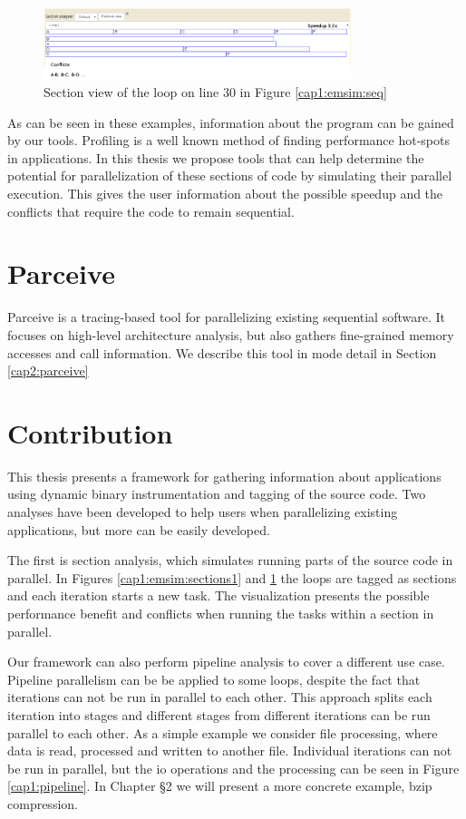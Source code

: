 \begin{figure}[!ht]
	\centering
	\includegraphics[width=0.8\textwidth]{loop2section}
	\caption{Section view of the loop on line 30 in Figure \ref{cap1:emsim:seq}}
	\label{cap1:emsim:sections2}
\end{figure}

As can be seen in these examples, information about the program can be gained by our tools. Profiling is a well known method of finding performance hot-spots in applications. In this thesis we propose tools that can help determine the potential for parallelization of these sections of code by simulating their parallel execution. This gives the user information about the possible speedup and the conflicts that require the code to remain sequential.

\section{Parceive}

Parceive \cite{parceive} is a tracing-based tool for parallelizing existing sequential software. It focuses on high-level architecture analysis, but also gathers fine-grained memory accesses and call information. We describe this tool in mode detail in Section \ref{cap2:parceive}

\section {Contribution}

This thesis presents a framework for gathering information about applications using dynamic binary instrumentation and tagging of the source code. Two analyses have been developed to help users when parallelizing existing applications, but more can be easily developed.

The first is section analysis, which simulates running parts of the source code in parallel. In Figures \ref{cap1:emsim:sections1} and \ref{cap1:emsim:sections2} the loops are tagged as sections and each iteration starts a new task. The visualization presents the possible performance benefit and conflicts when running the tasks within a section in parallel.

Our framework can also perform pipeline analysis to cover a different use case. Pipeline parallelism can be be applied to some loops, despite the fact that iterations can not be run in parallel to each other. This approach splits each iteration into stages and different stages from different iterations can be run parallel to each other. As a simple example we consider file processing, where data is read, processed and written to another file. Individual iterations can not be run in parallel, but the io operations and the processing can be seen in Figure \ref{cap1:pipeline}. In Chapter §2 we will present a more concrete example, bzip compression.

